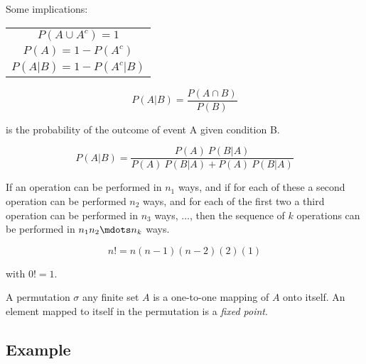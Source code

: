Some implications:

\begin{center}
  \begin{tabular}{c}
    $P(A \cup A^c) = 1$ \\
    $P(A) = 1 - P(A^c)$ \\
    $P(A|B) = 1 - P(A^c | B)$ \\
  \end{tabular}
\end{center}
\hformbar





\begin{equation}
	P(A|B) = \frac{P(A \cap B)}{P(B)}
\end{equation} 

is the probability of the outcome of event A given condition B.
\hformbar




\begin{equation}
  P(A|B) = \frac{P(A) ~P(B|A)}{ P(A) ~ P(B|A) + P(A) ~ P(B|A)}
\end{equation}
\hformbar





If an operation can be performed in $n_1$ ways, and if for each of these a second operation can be performed $n_2$ ways, and for each of the first two a third operation can be performed in $n_3$ ways, $\ldots$, then the sequence of $k$ operations can be performed in $n_1 n_2 \mdots n_k$ ways.

\hformbar




\begin{equation}
    n! = n (n-1) (n-2) (2) (1)
\end{equation}

with $0! = 1$.
\hformbar




A permutation $\sigma$ any finite set $A$ is a one-to-one mapping of $A$ onto itself. An element mapped to itself in the permutation is a \textit{fixed point}.

\subsection*{Example}

